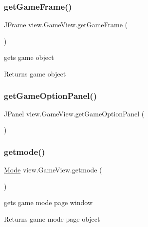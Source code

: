 \subsubsection{\texorpdfstring{get\+Game\+Frame()}{getGameFrame()}}
{\footnotesize\ttfamily J\+Frame view.\+Game\+View.\+get\+Game\+Frame (\begin{DoxyParamCaption}{ }\end{DoxyParamCaption})}



gets game object 

\begin{DoxyReturn}{Returns}
game object 
\end{DoxyReturn}
\hypertarget{classview_1_1_game_view_ab86ae5b0ca06d2ed673f43888d5547e5}{}\label{classview_1_1_game_view_ab86ae5b0ca06d2ed673f43888d5547e5} 
\subsubsection{\texorpdfstring{get\+Game\+Option\+Panel()}{getGameOptionPanel()}}
{\footnotesize\ttfamily J\+Panel view.\+Game\+View.\+get\+Game\+Option\+Panel (\begin{DoxyParamCaption}{ }\end{DoxyParamCaption})}

\hypertarget{classview_1_1_game_view_a427afb80cd453fd611670936793fb556}{}\label{classview_1_1_game_view_a427afb80cd453fd611670936793fb556} 
\subsubsection{\texorpdfstring{getmode()}{getmode()}}
{\footnotesize\ttfamily \hyperlink{classview_1_1_mode}{Mode} view.\+Game\+View.\+getmode (\begin{DoxyParamCaption}{ }\end{DoxyParamCaption})}



gets game mode page window 

\begin{DoxyReturn}{Returns}
game mode page object 
\end{DoxyReturn}
\hypertarget{classview_1_1_game_view_aaab8ca9baf7dce65a6a523a4b5c73feb}{}\label{classview_1_1_game_view_aaab8ca9baf7dce65a6a523a4b5c73feb} 
